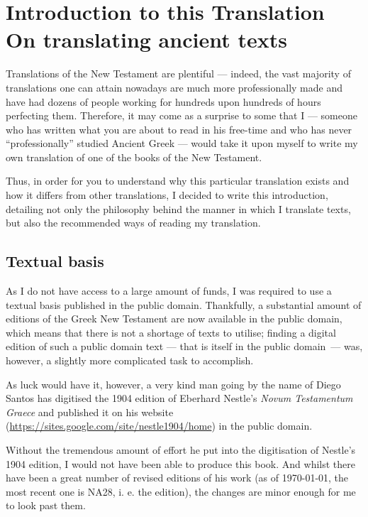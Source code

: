 \chapter*{Introduction to this Translation \\ \large On translating ancient texts}
  
Translations of the New Testament are plentiful — indeed, the vast majority of translations one can attain nowadays are much more professionally made and have had dozens of people working for hundreds upon hundreds of hours perfecting them. Therefore, it may come as a surprise to some that I — someone who has written what you are about to read in his free-time and who has never “professionally” studied Ancient Greek — would take it upon myself to write my own translation of one of the books of the New Testament. 

Thus, in order for you to understand why this particular translation exists and how it differs from other translations, I decided to write this introduction, detailing not only the philosophy behind the manner in which I translate texts, but also the recommended ways of reading my translation. 

\section*{Textual basis}
As I do not have access to a large amount of funds, I was required to use a textual basis published in the public domain. Thankfully, a substantial amount of editions of the Greek New Testament are now available in the public domain, which means that there is not a shortage of texts to utilise; finding a digital edition of such a public domain text — that is itself in the public domain — was, however, a slightly more complicated task to accomplish. 

As luck would have it, however, a very kind man going by the name of Diego Santos has digitised the 1904 edition of Eberhard Nestle's \textit{Novum Testamentum Graece} and published it on his website (\url{https://sites.google.com/site/nestle1904/home}) in the public domain.

Without the tremendous amount of effort he put into the digitisation of Nestle's 1904 edition, I would not have been able to produce this book. And whilst there have been a great number of revised editions of his work (as of \today, the most recent one is NA28, i. e. the  edition), the changes are minor enough for me to look past them. 


